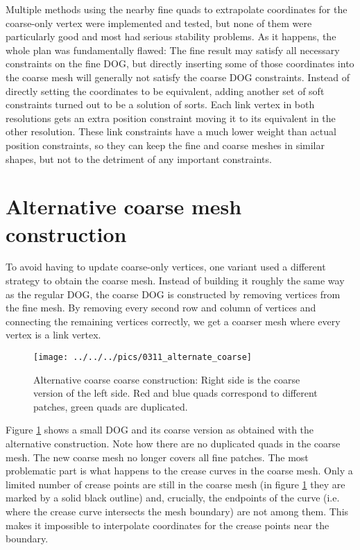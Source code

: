 \documentclass[a4paper,twoside,12pt,nochapterprefix]{scrbook}
\begin{document}
Multiple methods using the nearby fine quads to extrapolate coordinates for the coarse-only vertex were implemented and tested, but none of them were particularly good and most had serious stability problems. As it happens, the whole plan was fundamentally flawed: The fine result may satisfy all necessary constraints on the fine DOG, but directly inserting some of those coordinates into the coarse mesh will generally not satisfy the coarse DOG constraints.\newline
Instead of directly setting the coordinates to be equivalent, adding another set of soft constraints turned out to be a solution of sorts. Each link vertex in both resolutions gets an extra position constraint moving it to its equivalent in the other resolution. These link constraints have a much lower weight than actual position constraints, so they can keep the fine and coarse meshes in similar shapes, but not to the detriment of any important constraints.\newline
\section{Alternative coarse mesh construction}\label{sec:coarse_construction_alt}
To avoid having to update coarse-only vertices, one variant used a different strategy to obtain the coarse mesh. Instead of building it roughly the same way as the regular DOG, the coarse DOG is constructed by removing vertices from the fine mesh. By removing every second row and column of vertices and connecting the remaining vertices correctly, we get a coarser mesh where every vertex is a link vertex.\newline
\begin{figure}
    \centering
    \texttt{[image: ../../../pics/0311\_alternate\_coarse]}
    \caption{Alternative coarse coarse construction: Right side is the coarse version of the left side. Red and blue quads correspond to different patches, green quads are duplicated.}
    \label{fig:alt_coarse}
\end{figure}
Figure \ref{fig:alt_coarse} shows a small DOG and its coarse version as obtained with the alternative construction. Note how there are no duplicated quads in the coarse mesh. The new coarse mesh no longer covers all fine patches. The most problematic part is what happens to the crease curves in the coarse mesh. Only a limited number of crease points are still in the coarse mesh (in figure \ref{fig:alt_coarse} they are marked by a solid black outline) and, crucially, the endpoints of the curve (i.e. where the crease curve intersects the mesh boundary) are not among them. This makes it impossible to interpolate coordinates for the crease points near the boundary.\newline
\end{document}
